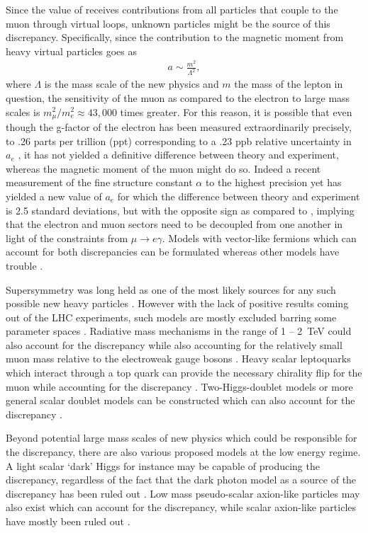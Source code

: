 Since the value of \amu receives contributions from all particles that couple to the muon through virtual loops, unknown particles might be the source of this discrepancy. Specifically, since the contribution to the magnetic moment from heavy virtual particles goes as 
		\begin{align}
            a \sim \frac{m^{2}}{\Lambda^{2}},
		\end{align}
where $\Lambda$ is the mass scale of the new physics and $m$ the mass of the lepton in question, the sensitivity of the muon as compared to the electron to large mass scales is $ m_{\mu}^{2} / m_{e}^{2} \approx 43,000$ times greater. For this reason, it is possible that even though the g-factor of the electron has been measured extraordinarily precisely, to .26 parts per trillion (ppt) corresponding to a .23 ppb relative uncertainty in $a_{e}$ \cite{ElectronMDM,CODATA}, it has not yielded a definitive difference between theory and experiment, whereas the magnetic moment of the muon might do so. Indeed a recent measurement of the fine structure constant $\alpha$ to the highest precision yet \cite{finestructureBerkeley} has yielded a new value of $a_{e}$ for which the difference between theory and experiment is 2.5 standard deviations, but with the opposite sign as compared to \amu, implying that the electron and muon sectors need to be decoupled from one another in light of the constraints from $\mu \rightarrow e\gamma$. Models with vector-like fermions which can account for both discrepancies can be formulated whereas other models have trouble \cite{PhysRevD.98.113002}.


Supersymmetry was long held as one of the most likely sources for any such possible new heavy particles \cite{Czarnecki_2001}. However with the lack of positive results coming out of the LHC experiments, such models are mostly excluded barring some parameter spaces \cite{Hagiwara_2018}. Radiative mass mechanisms in the range of 1 -- \SI{2}{\TeV} could also account for the discrepancy while also accounting for the relatively small muon mass relative to the electroweak gauge bosons \cite{Czarnecki_2001}. Heavy scalar leptoquarks which interact through a top quark can provide the necessary chirality flip for the muon while accounting for the discrepancy \cite{Leskow_2017}. Two-Higgs-doublet models or more general scalar doublet models can be constructed which can also account for the discrepancy \cite{crivellin2019bto,Abe_2019}.




Beyond potential large mass scales of new physics which could be responsible for the discrepancy, there are also various proposed models at the low energy regime. A light scalar `dark' Higgs for instance may be capable of producing the discrepancy, regardless of the fact that the dark photon model as a source of the discrepancy has been ruled out \cite{Chen:2015vqy,Ablikim:2017aab}. Low mass pseudo-scalar axion-like particles may also exist which can account for the discrepancy, while scalar axion-like particles have mostly been ruled out \cite{Marciano_2016}.


